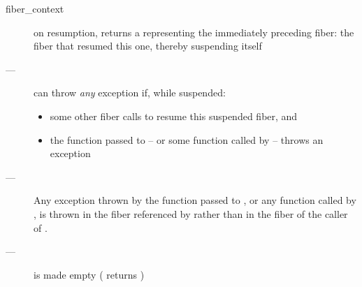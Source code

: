 \returns
\begin{description}
    \item[fiber\_context] on resumption, \xtresumewith returns a \fiber
               representing the immediately preceding fiber: the fiber that
               resumed this one, thereby suspending itself
\end{description}

\except
\begin{description}
    \item[---] \xtresumewith can
              throw \emph{any} exception if, while suspended:
              \begin{itemize}
                  \item some other fiber calls \someresumewith to
                        resume this suspended fiber, and
                  \item the function  passed to \someresumewith
                        -- or some function called
                        by  -- throws an exception
              \end{itemize}
    \item[---] Any exception thrown by the function  passed
              to \xtresumewith, or any function called
              by , is thrown in the fiber referenced by 
              rather than in the fiber of the caller of \xtresumewith.
\end{description}

\postcond
\begin{description}
    \item[---]  is made empty ( returns )
\end{description}




